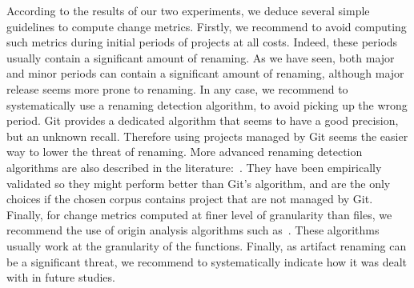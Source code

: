 According to the results of our two experiments, we deduce several simple guidelines to compute change metrics. Firstly, we recommend to avoid computing such metrics during initial periods of projects at all costs. Indeed, these periods usually contain a significant amount of renaming. As we have seen, both major and minor periods can contain a significant amount of renaming, although major release seems more prone to renaming. In any case, we recommend to systematically use a renaming detection algorithm, to avoid picking up the wrong period. Git provides a dedicated algorithm that seems to have a good precision, but an unknown recall. Therefore using projects managed by Git seems the easier way to lower the threat of renaming. More advanced renaming detection algorithms are also described in the literature:~\cite{antoniol_automatic_2004,lavoie_inferring_2012,steidl_incremental_2014}. They have been empirically validated so they might perform better than Git's algorithm, and are the only choices if the chosen corpus contains project that are not managed by Git. Finally, for change metrics computed at finer level of granularity than files, we recommend the use of origin analysis algorithms such as~\cite{wu_aura:_2010}. These algorithms usually work at the granularity of the functions. Finally, as artifact renaming can be a significant threat, we recommend to systematically indicate how it was dealt with in future studies.
